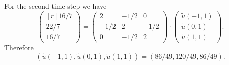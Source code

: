 \begin{loesung}
\begin{teilaufgaben}
For the second time step we have  
\begin{equation}
\begin{pmatrix*}[r]
 16/7 \\
 22/7 \\
 16/7
\end{pmatrix*}
=
\begin{pmatrix}
  2   & -1/2 &  0   \\
 -1/2 &  2   & -1/2 \\
  0   & -1/2 &  2
\end{pmatrix}
\cdot
\begin{pmatrix}
\tilde u(-1,1)  \\
\tilde u(0,1) \\
\tilde u(1,1)
\end{pmatrix}.
\tag{\bf 1P}
\end{equation}
Therefore
\begin{equation}
(\tilde u(-1,1), \tilde u(0,1), \tilde u(1,1))
=
(86/49, 120/49, 86/49).
\tag{\bf 1P}
\end{equation}
\qedhere
\end{teilaufgaben}
\end{loesung}
